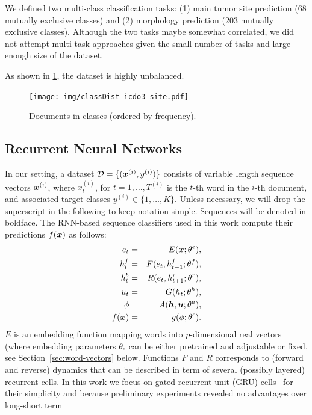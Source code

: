 We defined two multi-class classification tasks: (1) main tumor site
prediction ($68$ mutually exclusive classes) and (2) morphology
prediction ($203$ mutually exclusive
classes). Although the two tasks maybe somewhat correlated, we did not
attempt multi-task approaches given the small number of tasks and
large enough size of the dataset.

As shown in \cref{fig:classDist}, the dataset is highly unbalanced.
\begin{figure}
  \centering
  \texttt{[image: img/classDist-icdo3-site.pdf]}
  \caption{Documents in classes (ordered by
    frequency).}
  \label{fig:classDist}
\end{figure}

\subsection{Recurrent Neural Networks}
\label{sec:rnn}
In our setting, a dataset $\mathcal{D}=\{(\bm{x}^{(i)},y^{(i)})\}$
consists of variable length sequence vectors $\bm{x}^{(i)}$, where
$x^{(i)}_t$, for $t=1,\dots,T^{(i)}$ is the $t$-th word in the $i$-th
document, and associated target classes
$y^{(i)}\in\{1,\dots,K\}$. Unless necessary, we will drop the
superscript in the following to keep notation simple.  Sequences will
be denoted in boldface. The RNN-based sequence classifiers used in
this work compute their predictions $f(\bm{x})$ as follows:
\begin{align}
  e_t &=& E(\bm{x};\theta^e),\label{eq:embed}\\
  h^f_t &=& F(e_t,h^f_{t-1};\theta^f),\label{eq:maxModelRL}\\  
  h^b_t &=& R(e_t,h^r_{t+1};\theta^r),\label{eq:maxModelRR}\\
  u_t &=& G(h_t;\theta^h),\label{eq:maxModelF}\\
  \phi & =& A(\bm{h},\bm{u};\theta^a),\label{eq:aggregation}\\
  f(\bm{x}) &=& g(\phi;\theta^c).\label{eq:maxModelC}
\end{align}
$E$ is an embedding function mapping words into $p$-dimensional real
vectors (where embedding parameters $\theta_e$ can be either
pretrained and adjustable or fixed, see Section~\ref{sec:word-vectors}
below.  Functions $F$ and $R$ corresponds to (forward and reverse)
dynamics that can be described in term of several (possibly layered)
recurrent cells. In this work we focus on gated recurrent unit (GRU)
cells~\cite{cho2014properties} for their simplicity and because
preliminary experiments revealed no advantages over long-short term
